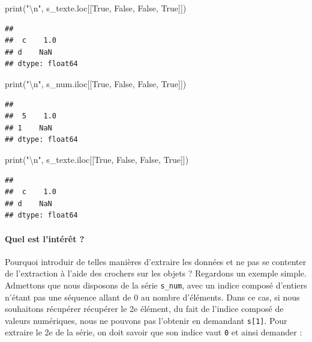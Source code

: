 \documentclass[12pt,]{book}
\newenvironment{Shaded}{\begin{snugshade}}{\end{snugshade}}
\newcommand{\CharTok}[1]{\textcolor[rgb]{0.31,0.60,0.02}{#1}}
\newcommand{\StringTok}[1]{\textcolor[rgb]{0.31,0.60,0.02}{#1}}
\newcommand{\VariableTok}[1]{\textcolor[rgb]{0.00,0.00,0.00}{#1}}
\newcommand{\BuiltInTok}[1]{#1}
\newcommand{\NormalTok}[1]{#1}
\let\oldparagraph\paragraph
\renewcommand{\paragraph}[1]{\oldparagraph{#1}\mbox{}}
\numberwithin{equation}{section}
\numberwithin{countremarque}{section}
\begin{document}
\begin{Shaded}
\begin{Highlighting}[]
\BuiltInTok{print}\NormalTok{(}\StringTok{"}\CharTok{\textbackslash{}n}\StringTok{"}\NormalTok{, s_texte.loc[[}\VariableTok{True}\NormalTok{, }\VariableTok{False}\NormalTok{, }\VariableTok{False}\NormalTok{, }\VariableTok{True}\NormalTok{]])}
\end{Highlighting}
\end{Shaded}

\begin{lstlisting}
## 
##  c    1.0
## d    NaN
## dtype: float64
\end{lstlisting}

\begin{Shaded}
\begin{Highlighting}[]
\BuiltInTok{print}\NormalTok{(}\StringTok{"}\CharTok{\textbackslash{}n}\StringTok{"}\NormalTok{, s_num.iloc[[}\VariableTok{True}\NormalTok{, }\VariableTok{False}\NormalTok{, }\VariableTok{False}\NormalTok{, }\VariableTok{True}\NormalTok{]])}
\end{Highlighting}
\end{Shaded}

\begin{lstlisting}
## 
##  5    1.0
## 1    NaN
## dtype: float64
\end{lstlisting}

\begin{Shaded}
\begin{Highlighting}[]
\BuiltInTok{print}\NormalTok{(}\StringTok{"}\CharTok{\textbackslash{}n}\StringTok{"}\NormalTok{, s_texte.iloc[[}\VariableTok{True}\NormalTok{, }\VariableTok{False}\NormalTok{, }\VariableTok{False}\NormalTok{, }\VariableTok{True}\NormalTok{]])}
\end{Highlighting}
\end{Shaded}

\begin{lstlisting}
## 
##  c    1.0
## d    NaN
## dtype: float64
\end{lstlisting}

\paragraph{Quel est l'intérêt ?}\label{quel-est-linteret}

Pourquoi introduir de telles manières d'extraire les données et ne pas
se contenter de l'extraction à l'aide des crochers sur les objets ?
Regardons un exemple simple. Admettons que nous disposons de la série
\texttt{s\_num}, avec un indice composé d'entiers n'étant pas une
séquence allant de 0 au nombre d'éléments. Dans ce cas, si nous
souhaitons récupérer récupérer le 2e élément, du fait de l'indice
composé de valeurs numériques, nous ne pouvons pas l'obtenir en
demandant \texttt{s{[}1{]}}. Pour extraire le 2e de la série, on doit
savoir que son indice vaut \texttt{0} et ainsi demander :
\end{document}
